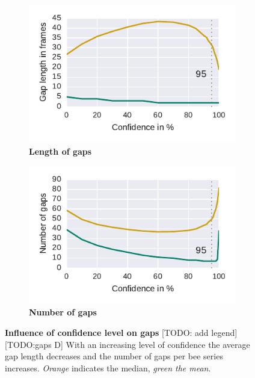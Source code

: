 \begin{figure}[htb]
	\centering
	\begin{subfigure}[b]{0.45\textwidth}
		\includegraphics[width=\textwidth]{Figures/gaplen}
		\caption[Length of gaps]{\textbf{Length of gaps}}
		\label{fig:gaplen}
	\end{subfigure}
	\begin{subfigure}[b]{0.45\textwidth}
		\includegraphics[width=\textwidth]{Figures/numgaps}
		\caption[Number of gaps]{\textbf{Number of gaps}}
		\label{fig:numgaps}
	\end{subfigure}
	\caption[Influence of Confidence Level on Gaps]{\textbf{Influence of confidence level on gaps} [TODO: add legend][TODO:gaps D] With an increasing level of confidence the average gap length decreases and the number of gaps per bee series increases. \emph{Orange} indicates the median, \emph{green the mean}.\protect\footnotemark }
	\label{fig:gaps}
\end{figure}

